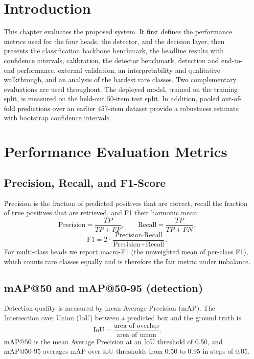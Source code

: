 \section{Introduction}
This chapter evaluates the proposed system. It first defines the performance metrics used for the four heads, the detector, and the decision layer, then presents the classification backbone benchmark, the headline results with confidence intervals, calibration, the detector benchmark, detection and end-to-end performance, external validation, an interpretability and qualitative walkthrough, and an analysis of the hardest rare classes. Two complementary evaluations are used throughout. The deployed model, trained on the training split, is measured on the held-out 50-item test split. In addition, pooled out-of-fold predictions over an earlier 457-item dataset provide a robustness estimate with bootstrap confidence intervals.

\section{Performance Evaluation Metrics}
\subsection{Precision, Recall, and F1-Score}
Precision is the fraction of predicted positives that are correct, recall the fraction of true positives that are retrieved, and F1 their harmonic mean:
\begin{equation}
\text{Precision} = \frac{TP}{TP+FP}, \qquad \text{Recall} = \frac{TP}{TP+FN},
\end{equation}
\begin{equation}
\text{F1} = 2\cdot\frac{\text{Precision}\cdot\text{Recall}}{\text{Precision}+\text{Recall}}.
\end{equation}
For multi-class heads we report macro-F1 (the unweighted mean of per-class F1), which counts rare classes equally and is therefore the fair metric under imbalance.

\subsection{mAP@50 and mAP@50-95 (detection)}
Detection quality is measured by mean Average Precision (mAP). The Intersection over Union (IoU) between a predicted box and the ground truth is
\begin{equation}
\text{IoU} = \frac{\text{area of overlap}}{\text{area of union}}.
\end{equation}
mAP@50 is the mean Average Precision at an IoU threshold of 0.50, and mAP@50-95 averages mAP over IoU thresholds from 0.50 to 0.95 in steps of 0.05.

